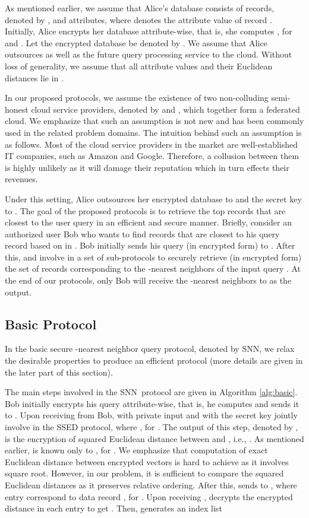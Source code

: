\documentclass{article}
\newcommand{\sknnb}{SNN}
\begin{document}
As mentioned earlier, we assume that Alice's 
database consists of  records, denoted by , 
and  attributes, 
where  denotes the  attribute value of record . Initially, Alice 
encrypts her database attribute-wise, that is, 
she computes , for  and . Let the encrypted database be denoted by . We assume 
that Alice outsources  as well as the future query processing service to the cloud. 
Without loss of generality, we assume that all attribute values and their Euclidean distances lie in . 

In our proposed protocols, we assume the existence of two non-colluding semi-honest 
cloud service providers, denoted by  and , which together form 
a federated cloud. We emphasize that such an assumption is not new and has been 
commonly used in the related problem domains\cite{twinclouds-2011,wang-fuzzy-2013}. The intuition behind 
such an assumption is as follows. Most of the cloud service providers in the market are well-established 
IT companies, such as Amazon and Google. Therefore,  a collusion 
between them is highly unlikely as it will damage their reputation which 
in turn effects their revenues. 

Under this setting, Alice outsources her encrypted database  
to  and the secret key  to . 
The goal of the proposed protocols is to retrieve the top 
 records that are closest to the user query  
in an efficient and secure manner. Briefly, consider an authorized user Bob who wants 
to find  records that are closest to his query 
record  based on  in . 
Bob initially sends his query  (in encrypted form) to . After
this,  and  involve in a set of sub-protocols to securely retrieve 
(in encrypted form) the set of  records corresponding 
to the -nearest neighbors of the input query . At the end of 
our protocols, only Bob will receive the -nearest neighbors to  as the output. 

\subsection{Basic Protocol}\label{sec:basic-method}

In the basic secure -nearest neighbor query protocol, denoted by SNN, 
we relax the desirable properties 
to produce an efficient protocol (more details are given in the later part of this section). 

The main steps involved in the \sknnb~protocol are given in Algorithm \ref{alg:basic}.
Bob initially encrypts his query  attribute-wise, that 
is, he computes  and 
sends it to . 
Upon receiving  from Bob,  with private input  
and  with the secret key  jointly involve in the SSED protocol, where 
, for . 
The output of this step, denoted by , is the encryption of 
squared Euclidean distance between  and , i.e., . As mentioned earlier,  is 
known only to , for . 
We emphasize that computation of exact Euclidean distance between encrypted 
vectors is hard to achieve as it involves square root. However, in our 
problem, it is sufficient to compare the squared Euclidean distances as 
it preserves relative ordering. After this,  sends  to , where entry  
correspond to data record , for . 
Upon receiving , 
 decrypts the encrypted distance in each entry to 
get . Then,  generates an index list  
  
\end{document}
